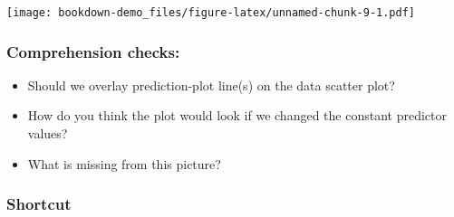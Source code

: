 \documentclass[]{book}
\newenvironment{Shaded}{\begin{snugshade}}{\end{snugshade}}
\newcommand{\CharTok}[1]{\textcolor[rgb]{0.31,0.60,0.02}{#1}}
\newcommand{\DataTypeTok}[1]{\textcolor[rgb]{0.13,0.29,0.53}{#1}}
\newcommand{\FloatTok}[1]{\textcolor[rgb]{0.00,0.00,0.81}{#1}}
\newcommand{\KeywordTok}[1]{\textcolor[rgb]{0.13,0.29,0.53}{\textbf{#1}}}
\newcommand{\NormalTok}[1]{#1}
\newcommand{\OperatorTok}[1]{\textcolor[rgb]{0.81,0.36,0.00}{\textbf{#1}}}
\newcommand{\StringTok}[1]{\textcolor[rgb]{0.31,0.60,0.02}{#1}}
\providecommand{\tightlist}{%
  \setlength{\itemsep}{0pt}\setlength{\parskip}{0pt}}
\begin{document}
\begin{Shaded}
\end{Shaded}

\texttt{[image: bookdown-demo\_files/figure-latex/unnamed-chunk-9-1.pdf]}

\hypertarget{comprehension-checks}{%
\subsubsection{Comprehension checks:}\label{comprehension-checks}}

\begin{itemize}
\tightlist
\item
  Should we overlay prediction-plot line(s) on the data scatter plot?
\item
  How do you think the plot would look if we changed the constant predictor values?
\item
  What is missing from this picture?
\end{itemize}

\hypertarget{shortcut}{%
\subsubsection{Shortcut}\label{shortcut}}
\end{document}
